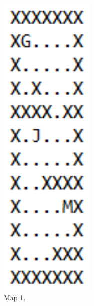 \documentclass[../report.tex]{subfiles}
\begin{document}
\begin{figure}[H]
    \centering
    \begin{subfigure}[b]{0.19\textwidth}
        \centering
        \includegraphics[width=0.5\textwidth]{figures/solver_design/map1.png}
        \captionsetup{width=0.9\textwidth}
        \caption{Map 1.}
        \label{subfig:map1}
    \end{subfigure}
    \begin{subfigure}[b]{0.19\textwidth}
        \centering

\end{subfigure}
\end{figure}
\end{document}
